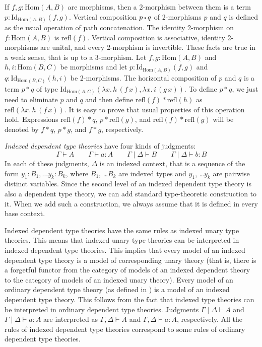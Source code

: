 \documentclass[reqno]{mscs}
\newcommand{\type}{}
\newcommand{\ob}{}
\newcommand{\fs}[1]{\mathrm{#1}}
\newcommand{\Hom}{\fs{Hom}}
\newcommand{\Id}{\fs{Id}}
\newcommand{\refl}{\fs{refl}}
\numberwithin{figure}{section}
\newcommand{\ct}{%
  \mathchoice{\mathbin{\raisebox{0.25ex}{$\displaystyle\centerdot$}}}%
             {\mathbin{\raisebox{0.25ex}{$\centerdot$}}}%
             {\mathbin{\raisebox{0.25ex}{$\scriptstyle\,\centerdot\,$}}}%
             {\mathbin{\raisebox{0.25ex}{$\scriptscriptstyle\,\centerdot\,$}}}
}
\begin{document}
If $f,g : \Hom(A,B)$ are morphisms, then a 2-morphism between them is a term $p : \Id_{\Hom(A,B)}(f,g)$.
Vertical composition $p \ct q$ of 2-morphisms $p$ and $q$ is defined as the usual operation of path concatenation.
The identity 2-morphism on $f : \Hom(A,B)$ is $\refl(f)$.
Vertical composition is associative, identity 2-morphisms are unital, and every 2-morphism is invertible.
These facts are true in a weak sense, that is up to a 3-morphism.
Let $f,g : \Hom(A,B)$ and $h,i : \Hom(B,C)$ be morphisms and let $p : \Id_{\Hom(A,B)}(f,g)$ and $q : \Id_{\Hom(B,C)}(h,i)$ be 2-morphisms.
The horizontal composition of $p$ and $q$ is a term $p * q$ of type $\Id_{\Hom(A,C)}(\lambda x.\,h\,(f\,x), \lambda x.\,i\,(g\,x))$.
To define $p * q$, we just need to eliminate $p$ and $q$ and then define $\refl(f) * \refl(h)$ as $\refl(\lambda x.\,h\,(f\,x))$.
It is easy to prove that usual properties of this operation hold.
Expressions $\refl(f) * q$, $p * \refl(g)$, and $\refl(f) * \refl(g)$ will be denoted by $f * q$, $p * g$, and $f * g$, respectively.

\emph{Indexed dependent type theories} have four kinds of judgments:
\[ \Gamma \vdash A \type \qquad \Gamma \vdash a : A \qquad \Gamma \mid \Delta \vdash B \ob \qquad \Gamma \mid \Delta \vdash b : B \]
In each of these judgments, $\Delta$ is an indexed context, that is a sequence of the form $y_1 : B_1, \ldots y_k : B_k$, where $B_1$, \ldots $B_k$ are indexed types and $y_1$, \ldots $y_k$ are pairwise distinct variables.
Since the second level of an indexed dependent type theory is also a dependent type theory,
we can add standard type-theoretic construction to it.
When we add such a construction, we always assume that it is defined in every base context.

Indexed dependent type theories have the same rules as indexed unary type theories.
This means that indexed unary type theories can be interpreted in indexed dependent type theories.
This implies that every model of an indexed dependent type theory is a model of corresponding unary theory
(that is, there is a forgetful functor from the category of models of an indexed dependent theory to the category of models of an indexed unary theory).
Every model of an ordinary dependent type theory (as defined in \cite{alg-tt}) is a model of an indexed dependent type theory.
This follows from the fact that indexed type theories can be interpreted in ordinary dependent type theories.
Judgments $\Gamma \mid \Delta \vdash A \ob$ and $\Gamma \mid \Delta \vdash a : A$ are interpreted as $\Gamma, \Delta \vdash A \type$ and $\Gamma, \Delta \vdash a : A$, respectively.
All the rules of indexed dependent type theories correspond to some rules of ordinary dependent type theories.
\end{document}
